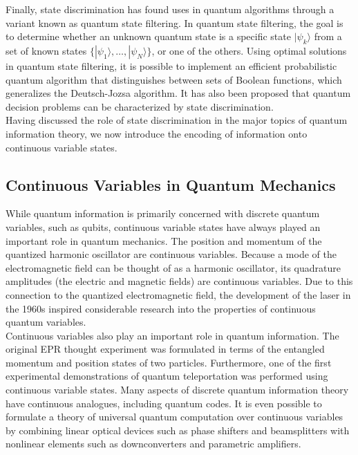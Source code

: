 Finally, state discrimination has found uses in quantum algorithms through a variant known as quantum state filtering. In quantum state filtering, the goal is to determine whether an unknown quantum state is a specific state $|\psi_k\rangle$ from a set of known states $\{|\psi_1\rangle, \ldots, |\psi_N\rangle\}$, or one of the others. Using optimal solutions in quantum state filtering, it is possible to implement an efficient probabilistic quantum algorithm that distinguishes between sets of Boolean functions, which generalizes the Deutsch-Jozsa algorithm. It has also been proposed that quantum decision problems can be characterized by state discrimination.\\

Having discussed the role of state discrimination in the major topics of quantum information theory, we now introduce the encoding of information onto continuous variable states.

\subsection{Continuous Variables in Quantum Mechanics}
While quantum information is primarily concerned with discrete quantum variables, such as qubits, continuous variable states have always played an important role in quantum mechanics. The position and momentum of the quantized harmonic oscillator are continuous variables. Because a mode of the electromagnetic field can be thought of as a harmonic oscillator, its quadrature amplitudes (the electric and magnetic fields) are continuous variables. Due to this connection to the quantized electromagnetic field, the development of the laser in the 1960s inspired considerable research into the properties of continuous quantum variables.\\

Continuous variables also play an important role in quantum information. The original EPR thought experiment was formulated in terms of the entangled momentum and position states of two particles. Furthermore, one of the first experimental demonstrations of quantum teleportation was performed using continuous variable states. Many aspects of discrete quantum information theory have continuous analogues, including quantum codes. It is even possible to formulate a theory of universal quantum computation over continuous variables by combining linear optical devices such as phase shifters and beamsplitters with nonlinear elements such as downconverters and parametric amplifiers.\\

